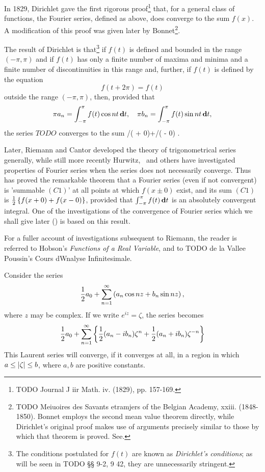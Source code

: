 %
%

In 1829, Dirichlet gave the first rigorous proof\footnote{TODO Journal J iir Math. iv. (1829), pp. 157-169.}
that, for a general class of functions, the Fourier series, defined as above, does
converge to the sum $f(x)$. A modification of this proof was given later
by Bonnet\footnote{TODO Meiuoires des Savants etramjers of the Belgian Academy, xxiii.
(1848-1850). Bonnet employs the second mean value theorem directly,
while Dirichlet's original proof makes use of arguments precisely
similar to those by which that theorem is proved. See.}.

The result of Dirichlet
is that\footnote{The conditions postulated for $f(t)$
  are known as \emph{Dirichlet's conditions}; as will be seen in TODO §§ 9-2, 9 42, they are unnecessarily
  stringent.}
if $f(t)$ is defined and bounded in the
range $(-\pi, \pi)$ and if $f(t)$ has only a finite number of maxima and
minima and a finite number of discontinuities in this range and,
further, if $f(t)$ is defined by the equation
$$
f(t + 2 \pi) = f(t)
$$
outside the range $(-\pi, \pi)$, then, provided that
$$
\pi a_{n}
=
\int_{-\pi}^{\pi} f(t) \cos nt \, \mathbf{d} t,
\quad
\pi b_{n}
=
\int_{-\pi}^{\pi} f(t) \sin nt \, \mathbf{d} t,
$$
the series $TODO$ converges to the sum /( +
0)+/( - 0) .

Later, Riemann and Cantor developed the theory of trigonometrical
series generally, while still more recently Hurwitz, \Fejer\ and others
have investigated properties of Fourier series when the series does
not necessarily converge. Thus \Fejer has proved the remarkable
theorem that a Fourier series (even if not convergent) is 'summable
$(C1)$' at all points at which $f(x \pm 0)$ exist, and its sum $(C1)$ is
$\frac{1}{2} \left\{  f(x+0) + f(x-0)  \right\}$,
provided that $\int_{-\pi}^{\pi} f(t) \, \mathbf{d} t$ is an absolutely convergent integral.
One of the investigations of the convergence of Fourier series which we shall give later
() is based on this result.

For a fuller account of investigations subsequent to Riemann, the
reader is referred to Hobson's \emph{Functions of a Real Variable}, and to
TODO de la Vallee Poussin's Cours dWnalyse Infinitesimale.


Consider the series
$$
\frac{1}{2} a_{0}
+
\sum_{n=1}^{\infty}
\left( 
  a_{n} \cos nz
  +
  b_{n} \sin nz
 \right),
$$
where $z$ may be complex. If we write
$e^{iz} = \zeta$, the series becomes
$$
\frac{1}{2} a_{0}
+
\sum_{n=1}^{\infty}
\left\{ 
  \frac{1}{2} (a_{n} - i b_{n}) \zeta^{n}
  +
  \frac{1}{2} (a_{n} + i b_{n}) \zeta^{-n}
 \right\}
$$
This Laurent series will converge, if it converges at all, in a region
in which $a \leq \left| \zeta \right| \leq b$, where $a,b$ are positive
constants.

